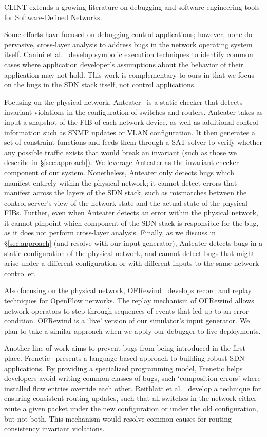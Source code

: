 CLINT extends a growing literature on debugging and software engineering tools for Software-Defined Networks.
    
Some efforts have focused on debugging control applications; however, none do pervasive,
cross-layer analysis to address bugs in the network operating system itself. 
Canini et al.~\cite{canini} develop symbolic execution techniques to identify
common cases where application developer's assumptions about the behavior of
their application may not hold. This work is complementary to ours in
that we focus on the bugs in the SDN stack itself, not control applications.

Focusing on the physical network, Anteater~\cite{anteater} is a static checker that
detects invariant violations in the configuration of switches and routers.
Anteater takes as input a snapshot of the FIB of each network device, as well as
additional control information such as SNMP updates or VLAN configuration. It then
generates a set of constraint functions and feeds them through a SAT solver to verify whether
any possible traffic exists that would break an invariant (such as those we describe in \S\ref{sec:approach}).
 We leverage
Anteater as the invariant checker component of our system.
Nonetheless, Anteater only detects bugs which manifest entirely within the physical network;  
it cannot detect errors that manifest across the layers of the SDN stack, such as mismatches
between the control server's view of the network state and the actual state of the
physical FIBs. Further, even when Anteater detects an error within the physical network, it cannot pinpoint
which component of the SDN stack is responsible for the bug, as it does not perform cross-layer
analysis. Finally, as we discuss in \S\ref{sec:approach} (and resolve with our input generator), 
Anteater detects bugs in a static configuration
of the physical network, and cannot detect bugs that might arise under a different configuration or with different
inputs to the same network controller.

Also focusing on the physical network, OFRewind~\cite{ofrewind} develops record and replay techniques
for OpenFlow networks. The replay
mechanism of OFRewind allows network operators to step through sequences of
events that led up to an error condition. OFRewind is a `live' version of our
simulator's input generator. We plan to take a similar approach when we apply
our debugger to live deployments. 

Another line of work aims to prevent bugs from being introduced in the first
place. Frenetic~\cite{frenetic} presents a language-based approach to building
robust SDN applications. By providing a specialized programming model, Frenetic helps developers avoid writing common classes of
bugs, such `composition errors' where installed flow entries override each other.
Reitblatt et al.~\cite{consistentupdates} develop a technique for ensuring
consistent routing updates, such that all switches in the network either route
a given packet under the new configuration or under the old configuration,
but not both. This mechanism would resolve common causes for routing consistency 
invariant violations.

